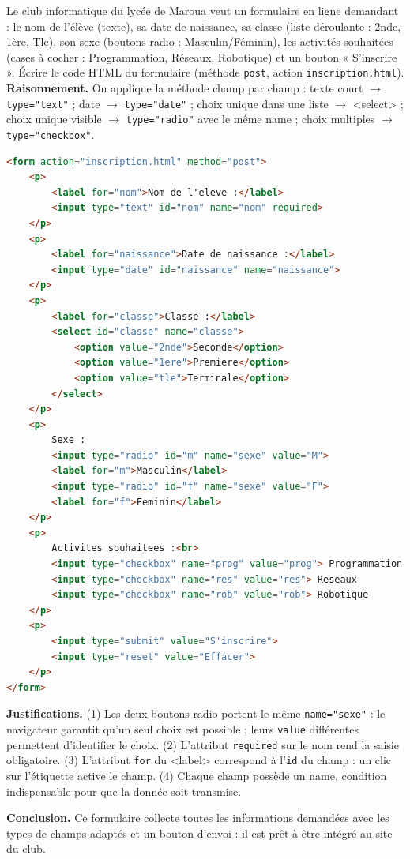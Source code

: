 \documentclass[11pt]{article}
\newcommand{\cle}[1]{{\popxbold\color{popdark}#1}}
\begin{document}
\begin{exoresolu}
Le club informatique du lycée de Maroua veut un formulaire en ligne demandant : le nom de l'élève (texte), sa date de naissance, sa classe (liste déroulante : 2nde, 1ère, Tle), son sexe (boutons radio : Masculin/Féminin), les activités souhaitées (cases à cocher : Programmation, Réseaux, Robotique) et un bouton « S'inscrire ». Écrire le code HTML du formulaire (méthode \texttt{post}, action \texttt{inscription.html}).
\tcblower
\textbf{Raisonnement.} On applique la méthode champ par champ : texte court $\rightarrow$ \texttt{type="text"} ; date $\rightarrow$ \texttt{type="date"} ; choix unique dans une liste $\rightarrow$ \cle{<select>} ; choix unique visible $\rightarrow$ \texttt{type="radio"} avec le même \cle{name} ; choix multiples $\rightarrow$ \texttt{type="checkbox"}.
\begin{lstlisting}[language=HTML]
<form action="inscription.html" method="post">
    <p>
        <label for="nom">Nom de l'eleve :</label>
        <input type="text" id="nom" name="nom" required>
    </p>
    <p>
        <label for="naissance">Date de naissance :</label>
        <input type="date" id="naissance" name="naissance">
    </p>
    <p>
        <label for="classe">Classe :</label>
        <select id="classe" name="classe">
            <option value="2nde">Seconde</option>
            <option value="1ere">Premiere</option>
            <option value="tle">Terminale</option>
        </select>
    </p>
    <p>
        Sexe :
        <input type="radio" id="m" name="sexe" value="M">
        <label for="m">Masculin</label>
        <input type="radio" id="f" name="sexe" value="F">
        <label for="f">Feminin</label>
    </p>
    <p>
        Activites souhaitees :<br>
        <input type="checkbox" name="prog" value="prog"> Programmation
        <input type="checkbox" name="res" value="res"> Reseaux
        <input type="checkbox" name="rob" value="rob"> Robotique
    </p>
    <p>
        <input type="submit" value="S'inscrire">
        <input type="reset" value="Effacer">
    </p>
</form>
\end{lstlisting}
\textbf{Justifications.} (1) Les deux boutons radio portent le même \texttt{name="sexe"} : le navigateur garantit qu'un seul choix est possible ; leurs \texttt{value} différentes permettent d'identifier le choix. (2) L'attribut \texttt{required} sur le nom rend la saisie obligatoire. (3) L'attribut \texttt{for} du \cle{<label>} correspond à l'\texttt{id} du champ : un clic sur l'étiquette active le champ. (4) Chaque champ possède un \cle{name}, condition indispensable pour que la donnée soit transmise.

\textbf{Conclusion.} Ce formulaire collecte toutes les informations demandées avec les types de champs adaptés et un bouton d'envoi : il est prêt à être intégré au site du club.
\end{exoresolu}
\end{document}
